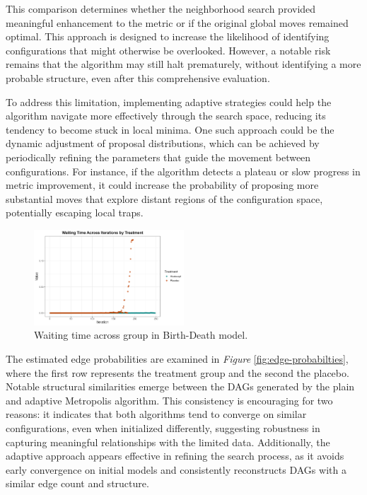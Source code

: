 \documentclass{report}
\begin{document}
	This comparison determines whether the neighborhood search provided meaningful enhancement to the metric or if the original global moves remained optimal. This approach is designed to increase the likelihood of identifying configurations that might otherwise be overlooked. However, a notable risk remains that the algorithm may still halt prematurely, without identifying a more probable structure, even after this comprehensive evaluation.
	
	To address this limitation, implementing adaptive strategies could help the algorithm navigate more effectively through the search space, reducing its tendency to become stuck in local minima. One such approach could be the dynamic adjustment of proposal distributions, which can be achieved by periodically refining the parameters that guide the movement between configurations. For instance, if the algorithm detects a plateau or slow progress in metric improvement, it could increase the probability of proposing more substantial moves that explore distant regions of the configuration space, potentially escaping local traps.
	
	\begin{figure}[ht] 
		\centering
		\includegraphics[width=0.5\textwidth]{Figures/Application/analysis/waiting_time.png}
		\caption{Waiting time across group in Birth-Death model.}
		\label{fig:waiting-time-groups}
	\end{figure}
	
	The estimated edge probabilities are examined in \textit{Figure} \ref{fig:edge-probabilties}, where the first row represents the treatment group and the second the placebo. Notable structural similarities emerge between the DAGs generated by the plain and adaptive Metropolis algorithm. This consistency is encouraging for two reasons: it indicates that both algorithms tend to converge on similar configurations, even when initialized differently, suggesting robustness in capturing meaningful relationships with the limited data. Additionally, the adaptive approach appears effective in refining the search process, as it avoids early convergence on initial models and consistently reconstructs DAGs with a similar edge count and structure.
	
\end{document}
